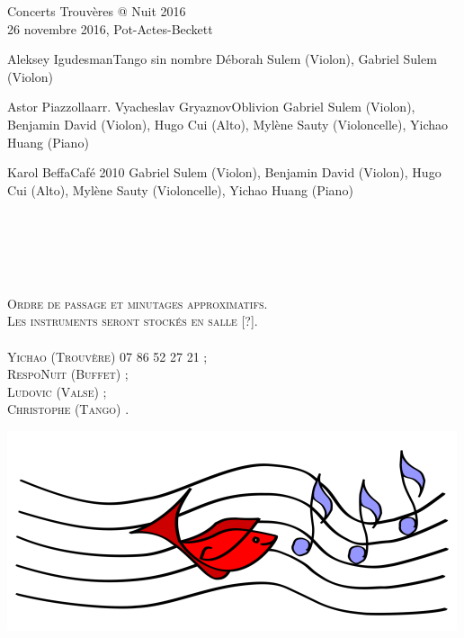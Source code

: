 \documentclass[a4paper,11pt,poets,durations]{ConcProg}
\begin{document}
{\begin{programme}{
    Concerts Trouvères @ Nuit 2016
\\  {\normalsize 26 novembre 2016, Pot-Actes-Beckett}
}
\begin{part}[]
\begin{composition}{Aleksey Igudesman}{}{Tango sin nombre}{}
      {\small Déborah Sulem (Violon), Gabriel Sulem (Violon)}
    \end{composition}
    \begin{composition}{Astor Piazzolla}{arr. Vyacheslav Gryaznov}{Oblivion}{}
      {\small Gabriel Sulem (Violon), Benjamin David (Violon), Hugo Cui (Alto), Mylène Sauty (Violoncelle), Yichao Huang (Piano)}
    \end{composition}
    \begin{composition}{Karol Beffa}{}{Café 2010}{}
      {\small Gabriel Sulem (Violon), Benjamin David (Violon), Hugo Cui (Alto), Mylène Sauty (Violoncelle), Yichao Huang (Piano)}
    \end{composition}\\
~\\
~\\
~\\
\begin{center}
\textsc{Ordre de passage et minutages approximatifs.\\Les instruments seront stockés en salle [?].}\\
~\\
\textsc{Yichao (Trouvère) 07 86 52 27 21 ;\\RespoNuit (Buffet) ;\\ Ludovic (Valse) ;\\ Christophe (Tango) .}
\end{center}
  \end{part}
\end{programme}
}
\begin{center}
\includegraphics[scale=2]{logo.png}
\end{center}
\end{document}
